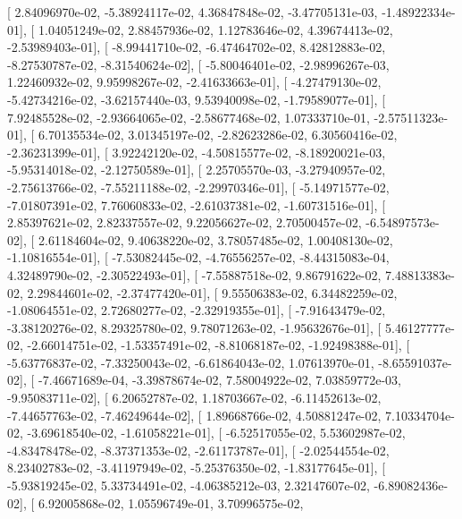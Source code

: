 \documentclass{article}
\begin{document}
       [  2.84096970e-02,  -5.38924117e-02,   4.36847848e-02,
         -3.47705131e-03,  -1.48922334e-01],
       [  1.04051249e-02,   2.88457936e-02,   1.12783646e-02,
          4.39674413e-02,  -2.53989403e-01],
       [ -8.99441710e-02,  -6.47464702e-02,   8.42812883e-02,
         -8.27530787e-02,  -8.31540624e-02],
       [ -5.80046401e-02,  -2.98996267e-03,   1.22460932e-02,
          9.95998267e-02,  -2.41633663e-01],
       [ -4.27479130e-02,  -5.42734216e-02,  -3.62157440e-03,
          9.53940098e-02,  -1.79589077e-01],
       [  7.92485528e-02,  -2.93664065e-02,  -2.58677468e-02,
          1.07333710e-01,  -2.57511323e-01],
       [  6.70135534e-02,   3.01345197e-02,  -2.82623286e-02,
          6.30560416e-02,  -2.36231399e-01],
       [  3.92242120e-02,  -4.50815577e-02,  -8.18920021e-03,
         -5.95314018e-02,  -2.12750589e-01],
       [  2.25705570e-03,  -3.27940957e-02,  -2.75613766e-02,
         -7.55211188e-02,  -2.29970346e-01],
       [ -5.14971577e-02,  -7.01807391e-02,   7.76060833e-02,
         -2.61037381e-02,  -1.60731516e-01],
       [  2.85397621e-02,   2.82337557e-02,   9.22056627e-02,
          2.70500457e-02,  -6.54897573e-02],
       [  2.61184604e-02,   9.40638220e-02,   3.78057485e-02,
          1.00408130e-02,  -1.10816554e-01],
       [ -7.53082445e-02,  -4.76556257e-02,  -8.44315083e-04,
          4.32489790e-02,  -2.30522493e-01],
       [ -7.55887518e-02,   9.86791622e-02,   7.48813383e-02,
          2.29844601e-02,  -2.37477420e-01],
       [  9.55506383e-02,   6.34482259e-02,  -1.08064551e-02,
          2.72680277e-02,  -2.32919355e-01],
       [ -7.91643479e-02,  -3.38120276e-02,   8.29325780e-02,
          9.78071263e-02,  -1.95632676e-01],
       [  5.46127777e-02,  -2.66014751e-02,  -1.53357491e-02,
         -8.81068187e-02,  -1.92498388e-01],
       [ -5.63776837e-02,  -7.33250043e-02,  -6.61864043e-02,
          1.07613970e-01,  -8.65591037e-02],
       [ -7.46671689e-04,  -3.39878674e-02,   7.58004922e-02,
          7.03859772e-03,  -9.95083711e-02],
       [  6.20652787e-02,   1.18703667e-02,  -6.11452613e-02,
         -7.44657763e-02,  -7.46249644e-02],
       [  1.89668766e-02,   4.50881247e-02,   7.10334704e-02,
         -3.69618540e-02,  -1.61058221e-01],
       [ -6.52517055e-02,   5.53602987e-02,  -4.83478478e-02,
         -8.37371353e-02,  -2.61173787e-01],
       [ -2.02544554e-02,   8.23402783e-02,  -3.41197949e-02,
         -5.25376350e-02,  -1.83177645e-01],
       [ -5.93819245e-02,   5.33734491e-02,  -4.06385212e-03,
          2.32147607e-02,  -6.89082436e-02],
       [  6.92005868e-02,   1.05596749e-01,   3.70996575e-02,
\end{document}
